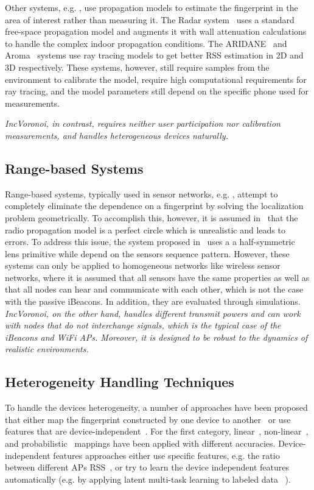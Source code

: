 \documentclass[conference]{IEEEtran}
\def \sys {\textit{IncVoronoi}}
\begin{document}
Other systems, e.g. \cite{RADAR00,ARIADNE,aroma}, use propagation models to estimate the fingerprint in the area of interest 
 rather than measuring it. The Radar system~\cite{RADAR00} uses a standard free-space propagation model and augments it with wall attenuation calculations to handle the complex indoor propagation conditions.
The ARIDANE~\cite{ARIADNE} and Aroma~\cite{aroma} systems use ray tracing models to get better RSS estimation in 2D and 3D respectively. These systems, however, still require samples from the environment to calibrate the model, require high computational requirements for ray tracing, 
 and the model parameters still depend on the specific phone used for measurements.

\emph{\sys{}, in contrast, requires neither user participation nor calibration measurements, and handles heterogeneous devices naturally.} 
\subsection{Range-based Systems} 
Range-based systems, typically used in sensor networks, e.g. \cite{youssef2007taxonomy,sheu2008distributed,ouadjaouteffective,yedavalli2005ecolocation,chen2009improved}, attempt to completely eliminate the dependence on a fingerprint by solving the localization problem geometrically. 
 To accomplish this, however, it is assumed in~\cite{sheu2008distributed} that the radio propagation model is a perfect circle which is unrealistic and leads to errors. To address this issue, the system proposed in~\cite{ouadjaouteffective} uses a a half-symmetric lens primitive while \cite{yedavalli2005ecolocation,chen2009improved} depend on the sensors sequence pattern. 
 However, these systems can only be applied to homogeneous networks like wireless sensor networks, where it is assumed that all sensors have the same properties as well as that all nodes can hear and communicate with each other, which is not the case with the passive iBeacons. In addition, they are evaluated through simulations. \emph{\sys{}, on the other hand, handles different transmit powers 
  and can work with nodes that do not interchange signals, which is the typical case of the iBeacons and WiFi APs. Moreover, it is designed to be robust to the dynamics of realistic environments.
}
\subsection{Heterogeneity Handling Techniques}
 To handle the devices heterogeneity, a number of approaches have been proposed that either map the fingerprint constructed by one device to another~\cite{het1,het2,het3} or use features that are device-independent~\cite{het5,het4}. For the first category, linear~\cite{het1}, non-linear~\cite{het2}, and probabilistic~\cite{het3} mappings have been applied with different accuracies. Device-independent features approaches either use specific features, e.g. the ratio between different APs RSS~\cite{het5}, or try to learn the device independent features automatically (e.g. by applying latent multi-task learning to labeled data ~\cite{het4}).
\end{document}
